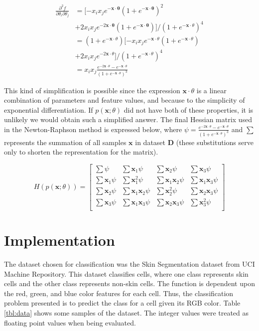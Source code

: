 \documentclass[letterpaper]{article} %
\begin{document}
\begin{align*}
\frac{\partial^2 f}{\partial\theta_i\partial\theta_j}
    &= [-x_ix_je^{-\mathbf{x\cdot\theta}}
       (1+e^{-\mathbf{x\cdot\theta}})^2 \\
    &+ 2x_ix_je^{-2\mathbf{x\cdot\theta}}
    (1+e^{-\mathbf{x\cdot\theta}})] / (1 + e^{-\mathbf{x}\cdot\theta})^4 \\
    &= (1 + e^{-\mathbf{x}\cdot\theta})
    [-x_ix_je^{-\mathbf{x}\cdot\theta}(1 + e^{-\mathbf{x}\cdot\theta}) \\
    &+ 2x_ix_je^{-2\mathbf{x}\cdot\theta}]
    / (1 + e^{-\mathbf{x}\cdot\theta})^4 \\
    &= x_ix_j\frac{e^{-2\mathbf{x}\cdot\theta} - e^{-\mathbf{x}\cdot\theta}}
       {(1 + e^{-\mathbf{x}\cdot\theta})^3}
\end{align*}

This kind of simplification is possible since the expression
$\mathbf{x}\cdot\theta$ is a linear combination of parameters and feature values,
and because to the simplicity of exponential differentiation.
If $p(\mathbf{x};\theta)$ did not have both of these properties,
it is unlikely we would obtain such a simplified answer.
The final Hessian matrix used in the Newton-Raphson method is expressed below,
where
$
\psi = \frac{e^{-2\mathbf{x}\cdot\theta} - e^{-\mathbf{x}\cdot\theta}}
{(1 + e^{-\mathbf{x}\cdot\theta})^3}
$
and $\sum$ represents the summation of all samples $\mathbf{x}$ in dataset $\mathbf{D}$
(these substitutions serve only to shorten the representation for the matrix).

\small
$$
H(p(\mathbf{x};\theta)) =
\begin{bmatrix}
\sum\psi & \sum\mathbf{x}_1\psi & \sum\mathbf{x}_2\psi & \sum\mathbf{x}_3\psi\\
\sum\mathbf{x}_1\psi  &  \sum\mathbf{x}_1^2\psi  &  \sum\mathbf{x}_1\mathbf{x}_2\psi  &  \sum\mathbf{x}_1\mathbf{x}_3\psi\\
\sum\mathbf{x}_2\psi  &  \sum\mathbf{x}_1\mathbf{x}_2\psi  &  \sum\mathbf{x}_2^2\psi  &  \sum\mathbf{x}_2\mathbf{x}_3\psi\\
\sum\mathbf{x}_3\psi  &  \sum\mathbf{x}_1\mathbf{x}_3\psi  &  \sum\mathbf{x}_2\mathbf{x}_3\psi  &  \sum\mathbf{x}_3^2\psi\\
\end{bmatrix}
$$
\normalsize

\section{Implementation}
The dataset chosen for classification was
the Skin Segmentation dataset from UCI Machine Repository.
This dataset classifies cells,
where one class represents skin cells and the other class represents non-skin cells.
The function is dependent upon the red, green, and blue color features for each cell.
Thus, the classification problem presented is to predict the class for a cell
given its RGB color. Table \ref{tbl:data} shows some samples of the dataset.
The integer values were treated as floating point values when being evaluated.
\end{document}
